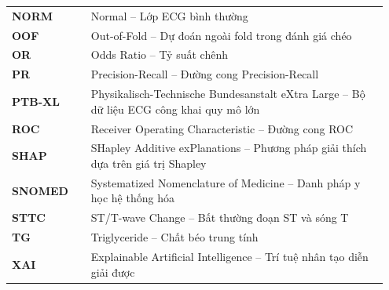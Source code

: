\begin{tabular}{@{}p{0.20\linewidth} p{0.75\linewidth}@{}}
\textbf{NORM} & Normal -- Lớp ECG bình thường \\[4pt]
\textbf{OOF} & Out-of-Fold -- Dự đoán ngoài fold trong đánh giá chéo \\[4pt]
\textbf{OR} & Odds Ratio -- Tỷ suất chênh \\[4pt]
\textbf{PR} & Precision-Recall -- Đường cong Precision-Recall \\[4pt]
\textbf{PTB-XL} & Physikalisch-Technische Bundesanstalt eXtra Large -- Bộ dữ liệu ECG công khai quy mô lớn \\[4pt]
\textbf{ROC} & Receiver Operating Characteristic -- Đường cong ROC \\[4pt]
\textbf{SHAP} & SHapley Additive exPlanations -- Phương pháp giải thích dựa trên giá trị Shapley \\[4pt]
\textbf{SNOMED} & Systematized Nomenclature of Medicine -- Danh pháp y học hệ thống hóa \\[4pt]
\textbf{STTC} & ST/T-wave Change -- Bất thường đoạn ST và sóng T \\[4pt]
\textbf{TG} & Triglyceride -- Chất béo trung tính \\[4pt]
\textbf{XAI} & Explainable Artificial Intelligence -- Trí tuệ nhân tạo diễn giải được \\[4pt]
\end{tabular}

